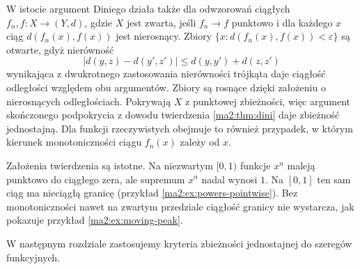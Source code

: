 \begin{uwaga}
W istocie argument Diniego działa także dla
odwzorowań ciągłych $f_n,f:X\to(Y,d)$, gdzie $X$
jest zwarta, jeśli $f_n\to f$ punktowo i dla każdego
$x$ ciąg $d(f_n(x),f(x))$ jest nierosnący.
Zbiory $\{x:d(f_n(x),f(x))<\varepsilon\}$ są otwarte,
gdyż nierówność
\[
 |d(y,z)-d(y',z')|\le d(y,y')+d(z,z')
\]
wynikająca z dwukrotnego zastosowania nierówności
trójkąta daje ciągłość odległości względem obu
argumentów. Zbiory są rosnące dzięki założeniu
o nierosnących odległościach.
Pokrywają $X$ z punktowej zbieżności, więc argument
skończonego podpokrycia z dowodu twierdzenia
\ref{ma2:thm:dini} daje zbieżność jednostajną.
Dla funkcji rzeczywistych obejmuje to również
przypadek, w którym kierunek monotoniczności
ciągu $f_n(x)$ zależy od $x$.
\end{uwaga}

Założenia twierdzenia są istotne. Na niezwartym
$[0,1)$ funkcje $x^n$ maleją punktowo do ciągłego
zera, ale supremum $x^n$ nadal wynosi $1$.
Na $[0,1]$ ten sam ciąg ma nieciągłą granicę
(przykład \ref{ma2:ex:powers-pointwise}).
Bez monotoniczności nawet na zwartym przedziale
ciągłość granicy nie wystarcza, jak pokazuje
przykład \ref{ma2:ex:moving-peak}.

W następnym rozdziale zastosujemy kryteria
zbieżności jednostajnej do szeregów funkcyjnych.

